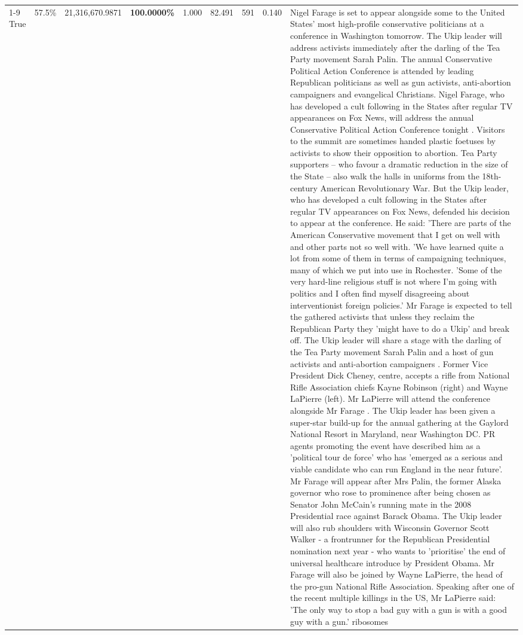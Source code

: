 \begin{table}[H]
\begin{tabular}{lllrlllll}
\cline{1-9} \cline{2-9}
True & 57.5\% & 21,316,670.9871 & \bfseries \color{red} 100.0000\% & 1.000 & 82.491 & 591 & 0.140 & Nigel Farage is set to appear alongside some to the United States' most high-profile conservative politicians at a conference in Washington tomorrow. The Ukip leader will address activists immediately after the darling of the Tea Party movement Sarah Palin. The annual Conservative Political Action Conference is attended by leading Republican politicians as well as gun activists, anti-abortion campaigners and evangelical Christians. Nigel Farage, who has developed a cult following in the States after regular TV appearances on Fox News, will address the annual Conservative Political Action Conference tonight . Visitors to the summit are sometimes handed plastic foetuses by activists to show their opposition to abortion. Tea Party supporters – who favour a dramatic reduction in the size of the State – also walk the halls in uniforms from the 18th-century American Revolutionary War. But the Ukip leader, who has developed a cult following in the States after regular TV appearances on Fox News, defended his decision to appear at the conference. He said: 'There are parts of the American Conservative movement that I get on well with and other parts not so well with. 'We have learned quite a lot from some of them in terms of campaigning techniques, many of which we put into use in Rochester. 'Some of the very hard-line religious stuff is not where I'm going with politics and I often find myself disagreeing about interventionist foreign policies.' Mr Farage is expected to tell the gathered activists that unless they reclaim the Republican Party they 'might have to do a Ukip' and break off. The Ukip leader will share a stage with the darling of the Tea Party movement Sarah Palin and a host of gun activists and anti-abortion campaigners . Former Vice President Dick Cheney, centre, accepts a rifle from National Rifle Association chiefs Kayne Robinson (right) and Wayne LaPierre (left). Mr LaPierre will attend the conference alongside Mr Farage . The Ukip leader has been given a super-star build-up for the annual gathering at the Gaylord National Resort in Maryland, near Washington DC. PR agents promoting the event have described him as a 'political tour de force' who has 'emerged as a serious and viable candidate who can run England in the near future'. Mr Farage will appear after Mrs Palin, the former Alaska governor who rose to prominence after being chosen as Senator John McCain's running mate in the 2008 Presidential race against Barack Obama. The Ukip leader will also rub shoulders with Wisconsin Governor Scott Walker - a frontrunner for the Republican Presidential nomination next year - who wants to 'prioritise' the end of universal healthcare introduce by President Obama. Mr Farage will also be joined by Wayne LaPierre, the head of the pro-gun National Rifle Association. Speaking after one of the recent multiple killings in the US, Mr LaPierre said: 'The only way to stop a bad guy with a gun is with a good guy with a gun.' ribosomes \\

\end{tabular}
\end{table}
